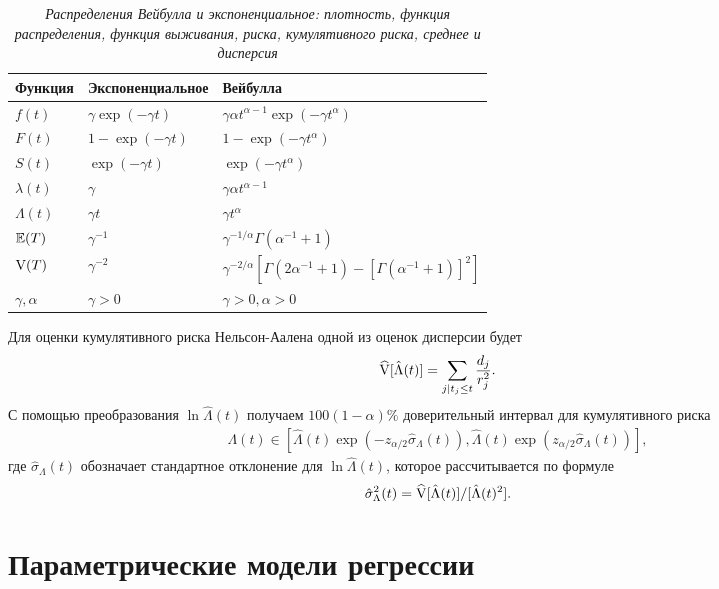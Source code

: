     \begin{table}[!htbp]\caption{\textit{Распределения Вейбулла и экспоненциальное: плотность, функция распределения, функция выживания, риска, кумулятивного риска, среднее и дисперсия}}\label{tab:17.4}
    \begin{center}
\begin{tabular}{lll}
\hline \hline
\textbf{Функция}&\textbf{Экспоненциальное}&\textbf{Вейбулла}\\
\hline
$f(t)$          &$\gamma\exp{(-\gamma t)}$  &$\gamma \alpha t^{\alpha-1}\exp{(-\gamma t^{\alpha})}$\\
$F(t)$          &$1-\exp{(-\gamma t)}$      &$1-\exp{(-\gamma t^{\alpha})}$\\
$S(t)$          &$\exp{(-\gamma t)}$        &$\exp{(-\gamma t^{\alpha})}$\\
$\lambda(t)$    &$\gamma$                   &$\gamma\alpha t^{\alpha-1}$\\
$\Lambda(t)$    &$\gamma t$                 &$\gamma t^{\alpha}$\\
$\mathbb{E}(T)$ &$\gamma^{-1}$              &$\gamma^{-1/\alpha}\Gamma(\alpha^{-1}+1)$\\
$\mathrm{V}(T)$ &$\gamma^{-2}$              &$\gamma^{-2/\alpha}[\Gamma(2\alpha^{-1}+1)-[\Gamma(\alpha^{-1}+1)]^2]$\\
$\gamma,\alpha$ &$\gamma>0$                 &$\gamma>0,\alpha>0$\\
\hline \hline
\end{tabular}
    \end{center}
    \end{table}

Для оценки кумулятивного риска Нельсон-Аалена одной из оценок дисперсии будет
    $$\widehat{\mathrm{V}}[\hat{\Lambda}(t)]=\sum_{j|t_j\le t} \frac{d_j}{r^2_j}.$$
С помощью преобразования $\ln\hat{\Lambda}(t)$ получаем $100(1-\alpha)\%$ доверительный интервал для кумулятивного риска
        \begin{align}
        \label{eq:17.16}
        \Lambda(t)\in [\hat{\Lambda}(t)\exp{(-z_{\alpha/2}\hat{\sigma}_{\Lambda}(t))}, \hat{\Lambda}(t)\exp{(z_{\alpha/2}\hat{\sigma}_{\Lambda}(t))}],
        \end{align}
где $\hat{\sigma}_{\Lambda}(t)$ обозначает стандартное отклонение для $\ln\hat{\Lambda}(t)$, которое рассчитывается по формуле
$$\hat{\sigma}^2_{\Lambda}(t)=\widehat{\mathrm{V}}[\hat{\Lambda}(t)]/[\hat{\Lambda}(t)^2].$$




\section{Параметрические модели регрессии}\label{sec:17.6}

